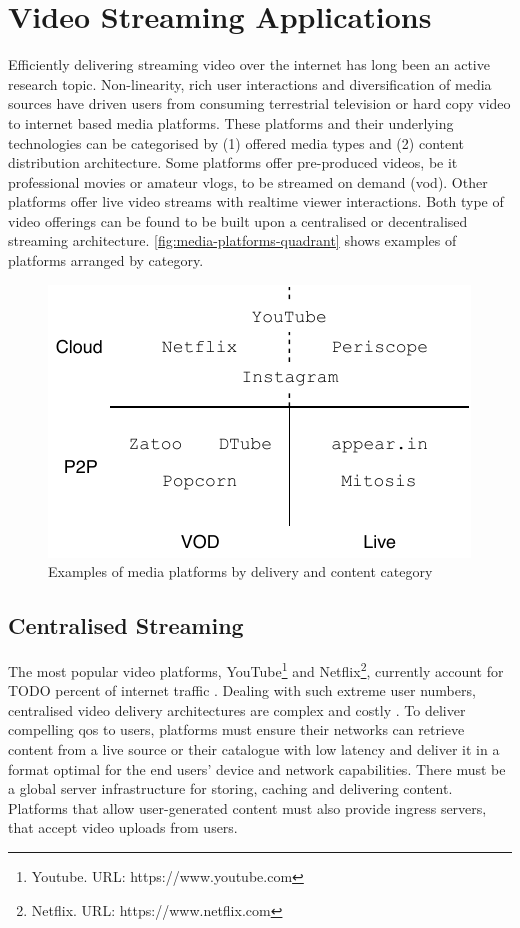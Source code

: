 \section{Video Streaming Applications}

Efficiently delivering streaming video over the internet has long been an active research topic. Non-linearity, rich user interactions and diversification of media sources have driven users from consuming terrestrial television or hard copy video to internet based media platforms.
These platforms and their underlying technologies can be categorised by (1) offered media types and (2) content distribution architecture. Some platforms offer pre-produced videos, be it professional movies or amateur vlogs, to be streamed on demand (\gls{vod}). Other platforms offer live video streams with realtime viewer interactions.
Both type of video offerings can be found to be built upon a centralised or decentralised streaming architecture. \vref{fig:media-platforms-quadrant} shows examples of platforms arranged by category.

\begin{figure}
\centering
\includegraphics[width=.75\textwidth]{graphics/media-platforms-quadrant.pdf}
\caption{Examples of media platforms by delivery and content category}
\label{fig:media-platforms-quadrant}
\end{figure}

\subsection{Centralised Streaming}

The most popular video platforms, YouTube\footnote{Youtube. URL: {https://www.youtube.com}} and Netflix\footnote{Netflix. URL: {https://www.netflix.com}}, currently account for TODO percent of internet traffic \cite[p 18]{phenomena-report}. Dealing with such extreme user numbers, centralised video delivery architectures are complex and costly \cite{market-driven-p2p}. To deliver compelling \gls{qos} to users, platforms must ensure their networks can retrieve content from a live source or their catalogue with low latency and deliver it in a format optimal for the end users' device and network capabilities. There must be a global server infrastructure for storing, caching and delivering content. Platforms that allow user-generated content must also provide ingress servers, that accept video uploads from users.

